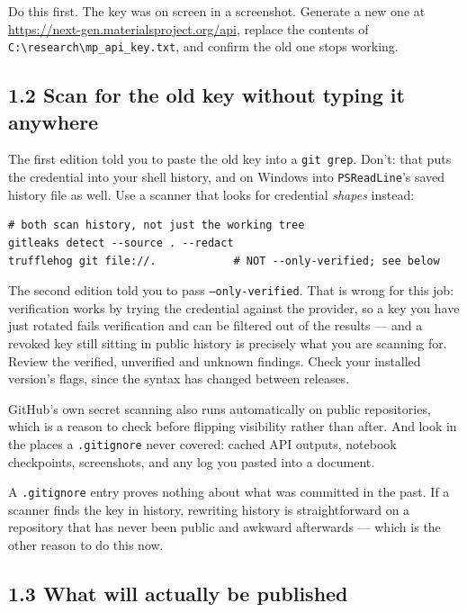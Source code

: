 \documentclass[11pt]{article}
\begin{document}
Do this first. The key was on screen in a screenshot. Generate a new one at
\url{https://next-gen.materialsproject.org/api}, replace the contents of
\texttt{C:\textbackslash research\textbackslash mp\_api\_key.txt}, and confirm the old one
stops working.

\subsection*{1.2 Scan for the old key without typing it anywhere}

The first edition told you to paste the old key into a \texttt{git grep}. Don't: that puts
the credential into your shell history, and on Windows into \texttt{PSReadLine}'s saved
history file as well. Use a scanner that looks for credential \emph{shapes} instead:

\begin{Verbatim}[fontsize=\small,frame=single]
# both scan history, not just the working tree
gitleaks detect --source . --redact
trufflehog git file://.            # NOT --only-verified; see below
\end{Verbatim}

The second edition told you to pass \texttt{--only-verified}. That is wrong for this job:
verification works by trying the credential against the provider, so a key you have just
rotated fails verification and can be filtered out of the results --- and a revoked key still
sitting in public history is precisely what you are scanning for. Review the verified,
unverified and unknown findings. Check your installed version's flags, since the syntax has
changed between releases.

GitHub's own secret scanning also runs automatically on public repositories, which is a
reason to check before flipping visibility rather than after. And look in the places a
\texttt{.gitignore} never covered: cached API outputs, notebook checkpoints, screenshots,
and any log you pasted into a document.

A \texttt{.gitignore} entry proves nothing about what was committed in the past. If a
scanner finds the key in history, rewriting history is straightforward on a repository that
has never been public and awkward afterwards --- which is the other reason to do this now.

\subsection*{1.3 What will actually be published}
\end{document}
